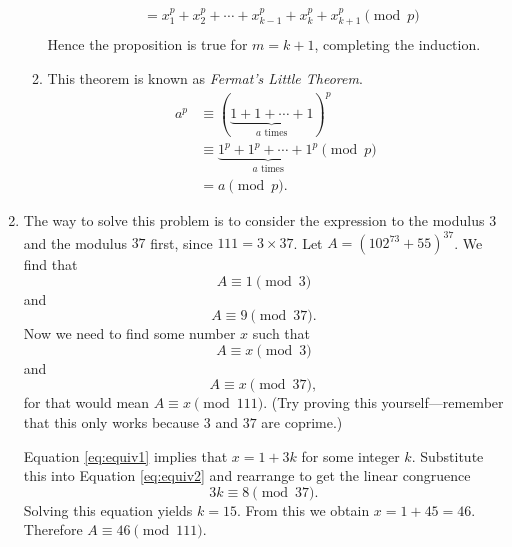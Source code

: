 \documentclass[a4paper]{article}
\begin{document}
\begin{enumerate}
\begin{enumerate}
\[\begin{split}
        &=x_1^p+x_2^p+\cdots+x_{k-1}^p+x_k^p+x_{k+1}^p\pmod{p}\\
      \end{split}
    \]
    Hence the proposition is true for \(m=k+1\), completing the induction.
  \item This theorem is known as \emph{Fermat's Little Theorem}.
    \[
      \begin{split}
        a^p&\equiv(\underbrace{1+1+\cdots+1}_{\text{\(a\) times}})^p\\&\equiv\underbrace{1^p+1^p+\cdots+1^p}_{\text{\(a\) times}}\pmod{p}\\
        &=a\pmod{p}.
      \end{split}
      \]

  \end{enumerate}
\item The way to solve this problem is to consider the expression to the modulus \(3\) and the modulus \(37\) first, since \(111=3\times37\).
  Let \(A=(102^{73}+55)^{37}\). We find that
\[
    A\equiv 1\pmod{3}
\]
  and
\[
    A\equiv 9\pmod{37}.
  \] Now we need to find some number \(x\) such
  that \begin{equation}\label{eq:equiv1}
    A\equiv x\pmod{3}
  \end{equation} and
  \begin{equation}\label{eq:equiv2}
        A\equiv x\pmod{37},
      \end{equation}
      for that would mean \(A\equiv x\pmod{111}\). (Try proving this yourself---remember
  that this only works because \(3\) and \(37\) are coprime.)

  Equation \eqref{eq:equiv1} implies that \(x=1+3k\) for some integer \(k\). Substitute this into Equation \eqref{eq:equiv2} and rearrange to
  get the linear congruence
  \[3k\equiv8\pmod{37}.\]
  Solving this equation yields \(k=15.\) From this we obtain \(x=1+45=46\). Therefore \(A\equiv 46\pmod{111}\).


\end{enumerate}
\end{document}
